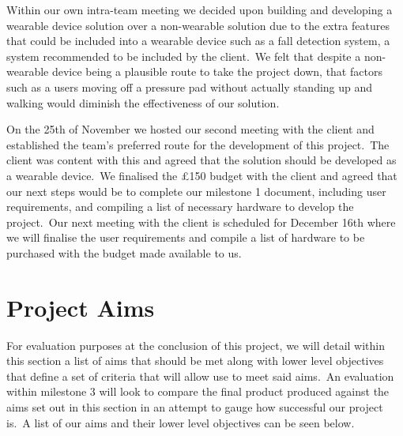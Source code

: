         Within our own intra-team meeting we decided upon building and developing a wearable device solution over a
        non-wearable solution due to the extra features that could be included into a wearable device such as a fall
        detection system, a system recommended to be included by the client.\ We felt that despite a non-wearable device
        being a plausible route to take the project down, that factors such as a users moving off a pressure
        pad without actually standing up and walking would diminish the effectiveness of our solution.

        On the 25th of November we hosted our second meeting with the client and established the team's preferred route
        for the development of this project.\ The client was content with this and agreed that the solution should be
        developed as a wearable device.\ We finalised the £150 budget with the client and agreed that our next steps
        would be to complete our milestone 1 document, including user requirements, and compiling a list of necessary
        hardware to develop the project.\ Our next meeting with the client is scheduled for December 16th where we will
        finalise the user requirements and compile a list of hardware to be purchased with the budget made available to
        us.

    \section{Project Aims}
        For evaluation purposes at the conclusion of this project, we will detail within this section a list of aims
        that should be met along with lower level objectives that define a set of criteria that will allow use to meet
        said aims.\ An evaluation within milestone 3 will look to compare the final product produced against the aims set
        out in this section in an attempt to gauge how successful our project is.\ A list of our aims and their lower
        level objectives can be seen below.

